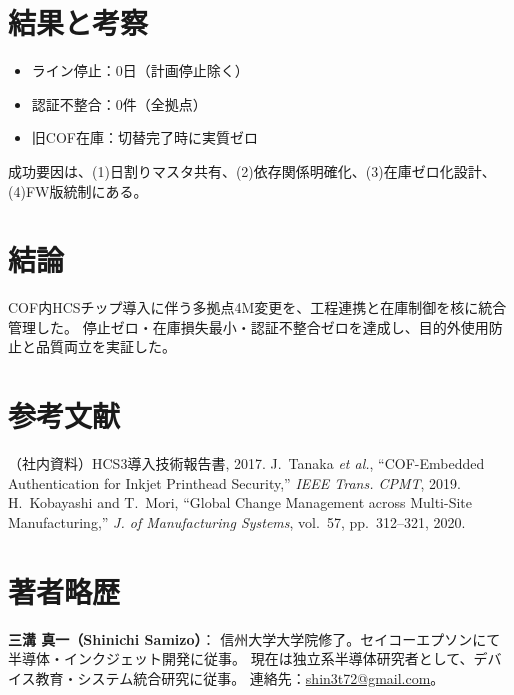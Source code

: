 \documentclass[journal,twocolumn]{IEEEtran}
\begin{document}
\section{結果と考察}
\begin{itemize}
  \item ライン停止：0日（計画停止除く）
  \item 認証不整合：0件（全拠点）
  \item 旧COF在庫：切替完了時に実質ゼロ
\end{itemize}
成功要因は、(1)日割りマスタ共有、(2)依存関係明確化、(3)在庫ゼロ化設計、(4)FW版統制にある。

\section{結論}
COF内HCSチップ導入に伴う多拠点4M変更を、工程連携と在庫制御を核に統合管理した。
停止ゼロ・在庫損失最小・認証不整合ゼロを達成し、目的外使用防止と品質両立を実証した。

\section*{参考文献}
\begin{thebibliography}{99}
 （社内資料）HCS3導入技術報告書, 2017.
 J.~Tanaka \emph{et al.}, ``COF-Embedded Authentication for Inkjet Printhead Security,'' \emph{IEEE Trans. CPMT}, 2019.
 H.~Kobayashi and T.~Mori, ``Global Change Management across Multi-Site Manufacturing,'' \emph{J. of Manufacturing Systems}, vol.~57, pp.~312--321, 2020.
\end{thebibliography}

\section*{著者略歴}
\noindent\textbf{三溝 真一（Shinichi Samizo）}：
信州大学大学院修了。セイコーエプソンにて半導体・インクジェット開発に従事。
現在は独立系半導体研究者として、デバイス教育・システム統合研究に従事。
連絡先：\href{mailto:shin3t72@gmail.com}{shin3t72@gmail.com}。
\end{document}
